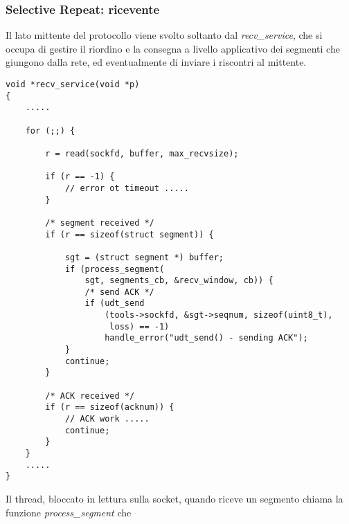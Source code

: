 \subsubsection{Selective Repeat: ricevente}
Il lato mittente del protocollo viene svolto soltanto dal 
\emph{recv\_service}, che si occupa di gestire il riordino
e la consegna a livello applicativo dei segmenti che giungono 
dalla rete, ed eventualmente di inviare i riscontri al mittente.
\begin{lstlisting}[title=transport.c]
void *recv_service(void *p)
{
    .....

    for (;;) {

        r = read(sockfd, buffer, max_recvsize);

        if (r == -1) {
            // error ot timeout .....     
        }

        /* segment received */
        if (r == sizeof(struct segment)) {

            sgt = (struct segment *) buffer;
            if (process_segment(
                sgt, segments_cb, &recv_window, cb)) {
                /* send ACK */
                if (udt_send
                    (tools->sockfd, &sgt->seqnum, sizeof(uint8_t),
                     loss) == -1)
                    handle_error("udt_send() - sending ACK");
            }
            continue;
        }

        /* ACK received */
        if (r == sizeof(acknum)) {
            // ACK work .....
            continue;
        }
    }
    .....
}
\end{lstlisting}
Il thread, bloccato in lettura sulla socket, quando riceve un segmento
chiama la funzione \emph{process\_segment} che

